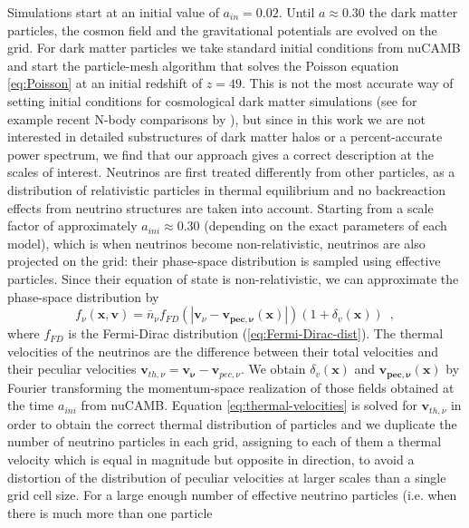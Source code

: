 Simulations start at an initial value of $a_{in}=0.02$. Until $a\approx0.30$
the dark matter particles, the cosmon field and the gravitational
potentials are evolved on the grid. For dark matter particles we take
standard initial conditions from nuCAMB and start the particle-mesh
algorithm that solves the Poisson equation \ref{eq:Poisson}
at an initial redshift of $z=49$. This is not the most accurate way
of setting initial conditions for cosmological dark matter simulations
(see for example recent N-body comparisons by \cite{schneider_matter_2016}),
but since in this work we are not interested in detailed substructures
of dark matter halos or a percent-accurate power spectrum, we find
that our approach gives a correct description at the scales of interest.
Neutrinos are first treated differently from other particles, as a
distribution of relativistic particles in thermal equilibrium and
no backreaction effects from neutrino structures are taken into account.
Starting from a scale factor of approximately $a_{ini}\approx0.30$
(depending on the exact parameters of each model), which is when neutrinos
become non-relativistic, neutrinos are also projected on the grid:
their phase-space distribution is sampled using effective particles.
Since their equation of state is non-relativistic, we can approximate
the phase-space distribution by 
\begin{equation}
f_{\nu}(\mathbf{x},\mathbf{v})=\bar{n}_{\nu}f_{FD}(|\mathbf{v}_{\nu}-\mathbf{v_{pec\mathbf{,}\nu}}(\mathbf{x})|)(1+\delta_{v}(\mathbf{x}))\,\,\,,
\label{eq:thermal-velocities}
\end{equation}
where $f_{FD}$ is the Fermi-Dirac distribution (\ref{eq:Fermi-Dirac-dist}).
The thermal velocities of the neutrinos are the difference between
their total velocities and their peculiar velocities $\mathbf{v}_{th,\nu}=\mathbf{v_{\nu}}-\mathbf{v}_{pec,\nu}$.
We obtain $\delta_{v}(\mathbf{x})$ and $\mathbf{v_{pec\mathbf{,}\nu}}(\mathbf{x})$
by Fourier transforming the momentum-space realization of those fields
obtained at the time $a_{ini}$ from nuCAMB. Equation \ref{eq:thermal-velocities}
is solved for $\mathbf{v}_{th,\nu}$ in order to obtain the correct
thermal distribution of particles and we duplicate the number of neutrino
particles in each grid, assigning to each of them a thermal velocity
which is equal in magnitude but opposite in direction, to avoid a
distortion of the distribution of peculiar velocities at larger scales
than a single grid cell size. For a large enough number of effective
neutrino particles (i.e. when there is much more than one particle
